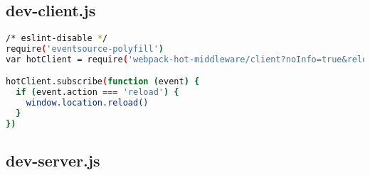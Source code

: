 \subsection{dev-client.js}


\begin{lstlisting}[language=bash]
/* eslint-disable */
require('eventsource-polyfill')
var hotClient = require('webpack-hot-middleware/client?noInfo=true&reload=true')

hotClient.subscribe(function (event) {
  if (event.action === 'reload') {
    window.location.reload()
  }
})
\end{lstlisting}


\subsection{dev-server.js}



